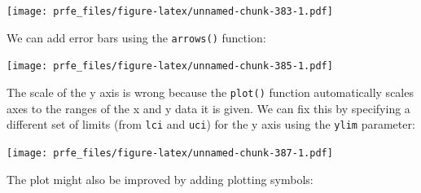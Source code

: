 \documentclass[12pt,]{book}
\newenvironment{Shaded}{\begin{snugshade}}{\end{snugshade}}
\newcommand{\KeywordTok}[1]{\textcolor[rgb]{0.13,0.29,0.53}{\textbf{#1}}}
\newcommand{\DataTypeTok}[1]{\textcolor[rgb]{0.13,0.29,0.53}{#1}}
\newcommand{\DecValTok}[1]{\textcolor[rgb]{0.00,0.00,0.81}{#1}}
\newcommand{\FloatTok}[1]{\textcolor[rgb]{0.00,0.00,0.81}{#1}}
\newcommand{\StringTok}[1]{\textcolor[rgb]{0.31,0.60,0.02}{#1}}
\newcommand{\OperatorTok}[1]{\textcolor[rgb]{0.81,0.36,0.00}{\textbf{#1}}}
\newcommand{\NormalTok}[1]{#1}
\theoremstyle{definition}
\theoremstyle{definition}
\theoremstyle{definition}
\theoremstyle{remark}
\begin{document}
\texttt{[image: prfe\_files/figure-latex/unnamed-chunk-383-1.pdf]}

We can add error bars using the \texttt{arrows()} function:

\begin{Shaded}
\end{Shaded}

\texttt{[image: prfe\_files/figure-latex/unnamed-chunk-385-1.pdf]}

The scale of the y axis is wrong because the \texttt{plot()} function
automatically scales axes to the ranges of the x and y data it is given.
We can fix this by specifying a different set of limits (from
\texttt{lci} and \texttt{uci}) for the y axis using the \texttt{ylim}
parameter:

\begin{Shaded}
\end{Shaded}

\texttt{[image: prfe\_files/figure-latex/unnamed-chunk-387-1.pdf]}

The plot might also be improved by adding plotting symbols:

\begin{Shaded}
\end{Shaded}
\end{document}
